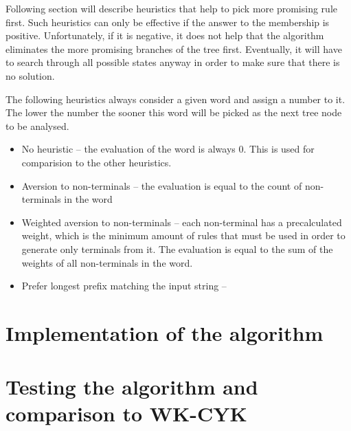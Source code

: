 \begin{enumerate}
Following section will describe heuristics that help to pick more promising rule first. Such heuristics can only be effective if the answer to the membership is positive. Unfortunately, if it is negative, it does not help that the algorithm eliminates the more promising branches of the tree first. Eventually, it will have to search through all possible states anyway in order to make sure that there is no solution.

The following heuristics always consider a given word and assign a number to it. The lower the number the sooner this word will be picked as the next tree node to be analysed.

\begin{itemize}
  \item{No heuristic -- the evaluation of the word is always 0. This is used for comparision to the other heuristics.}
  \item{Aversion to non-terminals -- the evaluation is equal to the count of non-terminals in the word}
  \item{Weighted aversion to non-terminals -- each non-terminal has a precalculated weight, which is the minimum amount of rules that must be used in order to generate only terminals from it. The evaluation is equal to the sum of the weights of all non-terminals in the word.}
  \item{Prefer longest prefix matching the input string -- }
\end{itemize}



\end{enumerate}


\chapter{Implementation of the algorithm}

\chapter{Testing the algorithm and comparison to WK-CYK}

